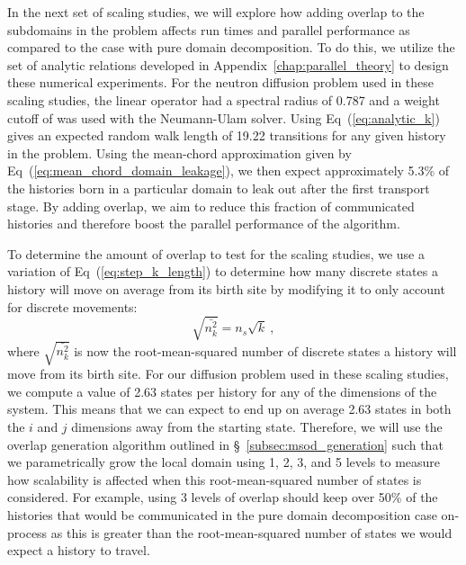 \documentclass{snamc2013}
\begin{document}
In the next set of scaling studies, we will explore how adding overlap
to the subdomains in the problem affects run times and parallel
performance as compared to the case with pure domain decomposition. To
do this, we utilize the set of analytic relations developed in
Appendix~\ref{chap:parallel_theory} to design these numerical
experiments. For the neutron diffusion problem used in these scaling
studies, the linear operator had a spectral radius of 0.787 and a
weight cutoff of  was used with the Neumann-Ulam
solver. Using Eq~(\ref{eq:analytic_k}) gives an expected random walk
length of 19.22 transitions for any given history in the
problem. Using the mean-chord approximation given by
Eq~(\ref{eq:mean_chord_domain_leakage}), we then expect approximately
5.3\% of the histories born in a particular domain to leak out after
the first transport stage. By adding overlap, we aim to reduce this
fraction of communicated histories and therefore boost the parallel
performance of the algorithm.

To determine the amount of overlap to test for the scaling studies, we
use a variation of Eq~(\ref{eq:step_k_length}) to determine how many
discrete states a history will move on average from its birth site by
modifying it to only account for discrete movements:
\begin{equation}
  \sqrt{\bar{n^2_k}} = n_s \sqrt{k}\:,
  \label{eq:discrete_distance}
\end{equation}
where $\sqrt{\bar{n^2_k}}$ is now the root-mean-squared number of
discrete states a history will move from its birth site. For our
diffusion problem used in these scaling studies, we compute a value of
2.63 states per history for any of the dimensions of the system. This
means that we can expect to end up on average 2.63 states in both the
$i$ and $j$ dimensions away from the starting state. Therefore, we
will use the overlap generation algorithm outlined in
\S~\ref{subsec:msod_generation} such that we parametrically grow the
local domain using 1, 2, 3, and 5 levels to measure how scalability is
affected when this root-mean-squared number of states is
considered. For example, using 3 levels of overlap should keep over
50\% of the histories that would be communicated in the pure domain
decomposition case on-process as this is greater than the
root-mean-squared number of states we would expect a history to
travel.
\end{document}
